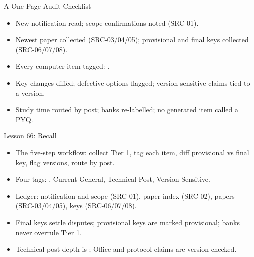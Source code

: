 \documentclass[aspectratio=169]{beamer}
\begin{document}
\begin{frame}{A One-Page Audit Checklist}
  \begin{itemize}
    \item New notification read; scope confirmations noted (SRC-01).
    \item Newest paper collected (SRC-03/04/05); provisional and final keys collected (SRC-06/07/08).
    \item Every computer item tagged: .
    \item Key changes diffed; defective options flagged; version-sensitive claims tied to a version.
    \item Study time routed by post; banks re-labelled; no generated item called a PYQ.
  \end{itemize}
\end{frame}

\begin{frame}{Lesson 66: Recall}
  \begin{itemize}
    \item The five-step workflow: collect Tier 1, tag each item, diff provisional vs final key, flag versions, route by post.
    \item Four tags: , Current-General, Technical-Post, Version-Sensitive.
    \item Ledger: notification and scope (SRC-01), paper index (SRC-02), papers (SRC-03/04/05), keys (SRC-06/07/08).
    \item Final keys settle disputes; provisional keys are marked provisional; banks never overrule Tier 1.
    \item Technical-post depth is ; Office and protocol claims are version-checked.
  \end{itemize}
\end{frame}
\end{document}
